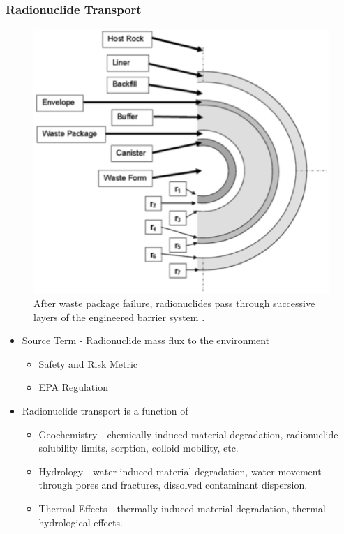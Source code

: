 

\begin{frame}[ctb!]
  \frametitle{Radionuclide Transport}
  \begin{minipage}{0.49\textwidth}
  \begin{figure}[h!]
      \includegraphics[width=\textwidth]{./images/ebsLayersLLNL.eps}
    \caption{After waste package failure, radionuclides pass through successive 
    layers of the engineered barrier system \cite{greenberg_thermal_2011}.}
    \label{fig:ebsLayersLLNL}
  \end{figure}
  \end{minipage}
  \hspace{0.01cm}
  \begin{minipage}{0.49\textwidth}
    \begin{itemize}
      \item Source Term - Radionuclide mass flux to the environment
        \begin{itemize}
          \item Safety and Risk Metric
          \item EPA Regulation
        \end{itemize}
      \item Radionuclide transport is a function of
        \begin{itemize}
          \item Geochemistry - chemically induced material degradation, 
            radionuclide solubility limits, sorption, colloid mobility, etc.
          \item Hydrology - water induced material degradation, 
            water movement through pores and fractures, 
            dissolved contaminant dispersion. 
          \item Thermal Effects - thermally induced material degradation, 
            thermal hydrological effects.
        \end{itemize}
    \end{itemize}
  \end{minipage}
\end{frame}



